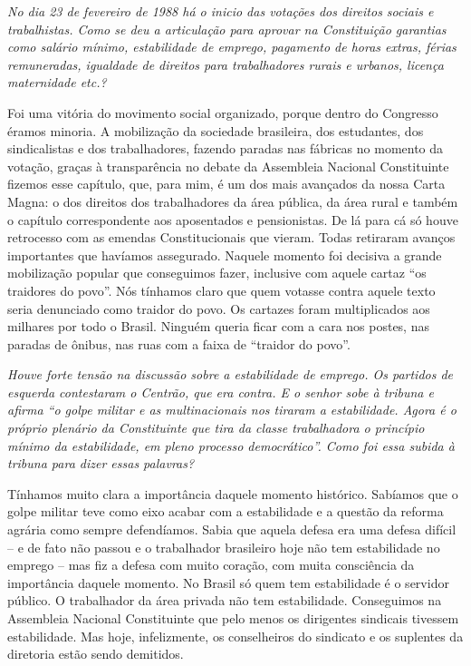 \noindent\emph{No dia 23 de fevereiro de 1988 há o inicio das votações dos
direitos sociais e trabalhistas. Como se deu a articulação para aprovar
na Constituição garantias como salário mínimo, estabilidade de emprego,
pagamento de horas extras, férias remuneradas, igualdade de direitos
para trabalhadores rurais e urbanos, licença maternidade etc.?}

Foi uma vitória do movimento social organizado, porque
dentro do Congresso éramos minoria. A mobilização da sociedade
brasileira, dos estudantes, dos sindicalistas e dos trabalhadores,
fazendo paradas nas fábricas no momento da votação, graças à
transparência no debate da Assembleia Nacional Constituinte fizemos esse
capítulo, que, para mim, é um dos mais avançados da nossa Carta Magna: o
dos direitos dos trabalhadores da área pública, da área rural e também o
capítulo correspondente aos aposentados e pensionistas. De lá para cá só
houve retrocesso com as emendas Constitucionais que vieram. Todas
retiraram avanços importantes que havíamos assegurado. Naquele momento
foi decisiva a grande mobilização popular que conseguimos fazer,
inclusive com aquele cartaz ``os traidores do povo''. Nós tínhamos claro
que quem votasse contra aquele texto seria denunciado como traidor do
povo. Os cartazes foram multiplicados aos milhares por todo o Brasil.
Ninguém queria ficar com a cara nos postes, nas paradas de ônibus, nas
ruas com a faixa de ``traidor do povo''.

\medskip

\noindent\emph{Houve forte tensão na discussão sobre a estabilidade de emprego.
Os partidos de esquerda contestaram o Centrão, que era contra. E o
senhor sobe à tribuna e afirma ``o golpe militar e as multinacionais nos
tiraram a estabilidade. Agora é o próprio plenário da Constituinte que
tira da classe trabalhadora o princípio mínimo da estabilidade, em pleno
processo democrático''. Como foi essa subida à tribuna para dizer essas
palavras?}

Tínhamos muito clara a importância daquele momento
histórico. Sabíamos que o golpe militar teve como eixo acabar com a
estabilidade e a questão da reforma agrária como sempre defendíamos.
Sabia que aquela defesa era uma defesa difícil -- e de fato não passou e
o trabalhador brasileiro hoje não tem estabilidade no emprego -- mas fiz
a defesa com muito coração, com muita consciência da importância daquele
momento. No Brasil só quem tem estabilidade é o servidor público. O
trabalhador da área privada não tem estabilidade. Conseguimos na
Assembleia Nacional Constituinte que pelo menos os dirigentes sindicais
tivessem estabilidade. Mas hoje, infelizmente, os conselheiros do
sindicato e os suplentes da diretoria estão sendo demitidos.

